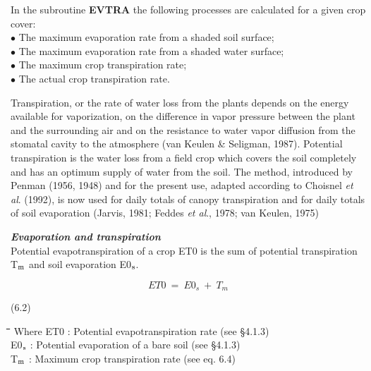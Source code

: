 \documentclass[11pt]{article}
\begin{document}
In the subroutine {\bf EVTRA} the following processes are calculated for a given crop cover:\\
$\bullet$ The maximum evaporation rate from a shaded soil surface;\\
$\bullet$ The maximum evaporation rate from a shaded water surface;\\
$\bullet$ The maximum crop transpiration rate;\\
$\bullet$ The actual crop transpiration rate. 

Transpiration, or the rate of water loss from the plants depends on the energy available
for vaporization, on the difference in vapor pressure between the plant and the surround\-ing air and on the resistance to water vapor diffusion from the stomatal cavity to the
atmosphere (van Keulen \& Seligman, 1987). Potential transpiration is the water loss from
a field crop which covers the soil completely and has an optimum supply of water from
the soil. The method, introduced by Penman (1956, 1948) and for the present use,
adapted according to Choisnel {\it et al\/}. (1992), is now used for daily totals of canopy
transpiration and for daily totals of soil evaporation (Jarvis, 1981; Feddes {\it et al\/}., 1978;
van Keulen, 1975)

\bigskip
\bigskip
{\bf {\it Evaporation and transpiration\/}}\\
Potential evapotranspiration of a crop ET0 is the sum of potential transpiration T$_{{\rm m}}$ and
soil evaporation E0$_{{\rm s}}$.

\begin{displaymath}
ET0 ~=~ E0 _{s} ~+~ T _{m} 
\end{displaymath}

 \bigskip
\strut\hfill (6.2)
\nwln
\begin{tabbing}
\hspace{1.27cm}\=\hspace{1.27cm}\=\hspace{1.27cm}\=\hspace{1.27cm}\=%
\hspace{1.27cm}\=\hspace{1.27cm}\=\hspace{1.27cm}\=\hspace{1.27cm}\=%
\hspace{1.27cm}\=\hspace{1.27cm}\=\kill
Where\> \> ET0\> : Potential evapotranspiration rate (see \S 4.1.3)\> \> \> \> \> \> \> [cm d$^{{\rm -1}}$]\\
\>\> E0$_{{\rm s}}$\> : Potential evaporation of a bare soil (see \S 4.1.3)\> \> \> \> \> \> \> [cm d$^{{\rm -1}}$]\\
\>\> T$_{{\rm m}}$\> : Maximum crop transpiration rate (see eq. 6.4)\> \> \> \> \> \> \> [cm d$^{{\rm -1}}$]
\end{tabbing}
\end{document}
